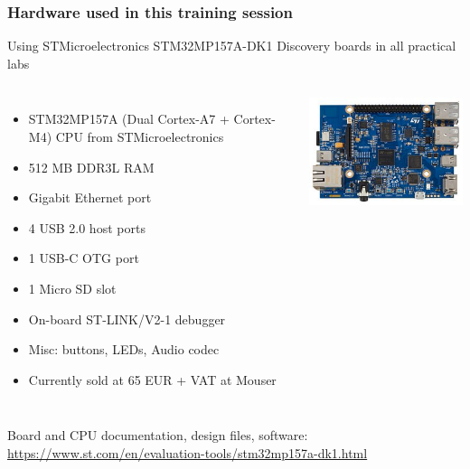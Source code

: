 \begin{frame}
\frametitle{Hardware used in this training session}
  Using STMicroelectronics STM32MP157A-DK1 Discovery boards in all practical labs
  \begin{columns}
    {\footnotesize
    \begin{itemize}
    \item STM32MP157A (Dual Cortex-A7 + Cortex-M4) CPU from STMicroelectronics
    \item 512 MB DDR3L RAM
    \item Gigabit Ethernet port
    \item 4 USB 2.0 host ports
    \item 1 USB-C OTG port
    \item 1 Micro SD slot
    \item On-board ST-LINK/V2-1 debugger
    \item Misc: buttons, LEDs, Audio codec
    \item Currently sold at 65 EUR + VAT at Mouser
    \end{itemize}
    }
    \includegraphics[width=\textwidth]{slides/discovery-board/discovery-board.jpg}
  \end{columns}
  \vspace{1em}
  {\small
  Board and CPU documentation, design files, software:
  \url{https://www.st.com/en/evaluation-tools/stm32mp157a-dk1.html}
  }
\end{frame}
